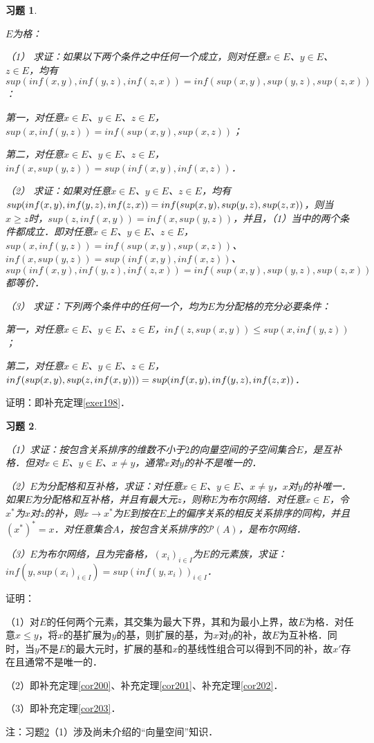 \documentclass[12pt, a4paper, oneside]{book}
\newtheorem{exer}{习题}
\begin{document}
			\begin{exer}\label{exer92}
				\hfill\par
				$E$为格：
				\par
				（1）	求证：如果以下两个条件之中任何一个成立，则对任意$x\in E$、$y\in E$、$z\in E$，均有$sup(inf(x, y), inf(y, z), inf(z, x))=inf(sup(x, y), sup(y, z), sup(z, x))$：
				\par
				第一，对任意$x\in E$、$y\in E$、$z\in E$，$sup(x, inf(y, z))=inf(sup(x, y), sup(x, z))$；
				\par
				第二，对任意$x\in E$、$y\in E$、$z\in E$，$inf(x, sup(y, z))=sup(inf(x, y), inf(x, z))$．
				\par
				（2）	求证：如果对任意$x\in E$、$y\in E$、$z\in E$，均有$sup(inf(x, y), inf(y, z), inf(z, x))\\=inf(sup(x, y), sup(y, z), sup(z, x))$，则当$x\geq z$时，$sup(z, inf(x, y))=inf(x, sup(y, z))$，并且，（1）当中的两个条件都成立．即对任意$x\in E$、$y\in E$、$z\in E$，$sup(x, inf(y, z))=inf(sup(x, y), sup(x, z))$、$inf(x, sup(y, z))=sup(inf(x, y), inf(x, z))$、\\$sup(inf(x, y), inf(y, z), inf(z, x))=inf(sup(x, y), sup(y, z), sup(z, x))$都等价．
				\par
				（3）	求证：下列两个条件中的任何一个，均为$E$为分配格的充分必要条件：
				\par
				第一，对任意$x\in E$、$y\in E$、$z\in E$，$inf(z, sup(x, y))\leq sup(x, inf(y, z))$；
				\par
				第二，对任意$x\in E$、$y\in E$、$z\in E$，$inf(sup(x, y), sup(z, inf(x, y)))=\\sup(inf(x, y), inf(y, z), inf(z, x))$．
			\end{exer}
			证明：即补充定理\ref{exer198}．
			
			\begin{exer}\label{exer93}
				\hfill\par
				（1）求证：按包含关系排序的维数不小于$2$的向量空间的子空间集合$E$，是互补格．但对$x\in E$、$y\in E$、$x\neq y$，通常$x$对$y$的补不是唯一的．
				\par
				（2）$E$为分配格和互补格，求证：对任意$x\in E$、$y\in E$、$x\neq y$，$x$对$y$的补唯一．如果$E$为分配格和互补格，并且有最大元$z$，则称$E$为布尔网络．对任意$x\in E$，令$x^*$为$x$对$z$的补，则$x\to x^*$为$E$到按在$E$上的偏序关系的相反关系排序的同构，并且$(x^*)^*=x$．对任意集合$A$，按包含关系排序的$\mathcal{P}(A)$，是布尔网络．
				\par
				（3）$E$为布尔网络，且为完备格，$(x_i)_{i\in I}$为$E$的元素族，求证：$inf(y, sup(x_i)_{i\in I})=sup(inf(y, x_i))_{i\in I}$．
			\end{exer}
			证明：
			\par
			（1）对$E$的任何两个元素，其交集为最大下界，其和为最小上界，故$E$为格．对任意$x\leq y$，将$x$的基扩展为$y$的基，则扩展的基，为$x$对$y$的补，故$E$为互补格．同时，当$y$不是$E$的最大元时，扩展的基和$x$的基线性组合可以得到不同的补，故$x'$存在且通常不是唯一的．
			\par
			（2）即补充定理\ref{cor200}、补充定理\ref{cor201}、补充定理\ref{cor202}．
			\par
			（3）即补充定理\ref{cor203}．
			\par
			注：习题\ref{exer93}（1）涉及尚未介绍的“向量空间”知识．
			
\end{document}
